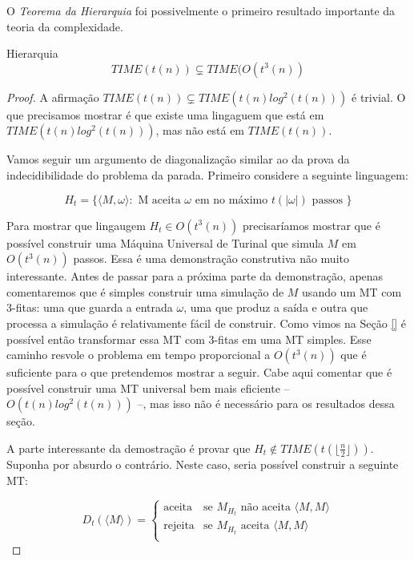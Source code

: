 O {\em Teorema da Hierarquia} foi possivelmente o primeiro resultado importante da teoria da complexidade.

\begin{theorem}{Hierarquia}
  \begin{displaymath}
    TIME(t(n)) \varsubsetneq TIME(O(t^3(n))
  \end{displaymath}
\end{theorem}
\begin{proof}
  A afirmação $TIME(t(n)) \subsetneq TIME(t(n) log^2(t(n)))$ é trivial.
  O que precisamos mostrar é que existe uma lingaguem que está em $TIME(t(n) log^2(t(n)))$, mas não está em $TIME(t(n))$.
  
  Vamos seguir um argumento de diagonalização similar ao da prova da indecidibilidade do problema da parada.
  Primeiro considere a seguinte linguagem:

  \begin{displaymath}
    H_t = \{ \langle M, \omega \rangle : \textrm{ M aceita $\omega$ em no máximo $t(|\omega|)$ passos }\}
  \end{displaymath}

  Para mostrar que lingaugem $H_t \in O(t^3(n))$ precisaríamos mostrar que é possível construir uma Máquina Universal de Turinal que simula $M$ em $O(t^3(n))$ passos.
  Essa é uma demonstração construtiva não muito interessante.
  Antes de passar para a próxima parte da demonstração, apenas comentaremos que é simples construir uma simulação de $M$ usando um MT com 3-fitas: uma que guarda a entrada $\omega$, uma que produz a saída e outra que processa a simulação é relativamente fácil de construir.
  Como vimos na Seção \ref{} é possível então transformar essa MT com 3-fitas em uma MT simples.
  Esse caminho resvole o problema em tempo proporcional a $O(t^3(n))$ que é suficiente para o que pretendemos mostrar a seguir.
  Cabe aqui comentar que é possível construir uma MT universal bem mais eficiente -- $O(t(n) log^2(t(n)))$ --, mas isso não é necessário para os resultados dessa seção.
  
  A parte interessante da demostração é provar que $H_t \notin TIME(t(\lfloor \frac{n}{2}\rfloor))$.
  Suponha por absurdo o contrário.
  Neste caso, seria possível construir a seguinte MT:

  \begin{displaymath}
    D_t(\langle M \rangle) =  \left\{\begin{array}{cl}
    \textrm{aceita} & \textrm{se $M_{H_t}$ não aceita $\langle M, M \rangle$}\\
    \textrm{rejeita} & \textrm{se $M_{H_t}$ aceita $\langle M, M \rangle$}\\ 
    \end{array}\right.
  \end{displaymath}


\end{proof}
